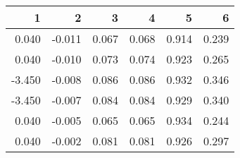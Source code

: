 \begin{table}[ht]
\centering
\begin{tabular}{rrrrrr}
  \hline
1 & 2 & 3 & 4 & 5 & 6 \\ 
  \hline
0.040 & -0.011 & 0.067 & 0.068 & 0.914 & 0.239 \\ 
  0.040 & -0.010 & 0.073 & 0.074 & 0.923 & 0.265 \\ 
  -3.450 & -0.008 & 0.086 & 0.086 & 0.932 & 0.346 \\ 
  -3.450 & -0.007 & 0.084 & 0.084 & 0.929 & 0.340 \\ 
  0.040 & -0.005 & 0.065 & 0.065 & 0.934 & 0.244 \\ 
  0.040 & -0.002 & 0.081 & 0.081 & 0.926 & 0.297 \\ 
   \hline
\end{tabular}
\end{table}
